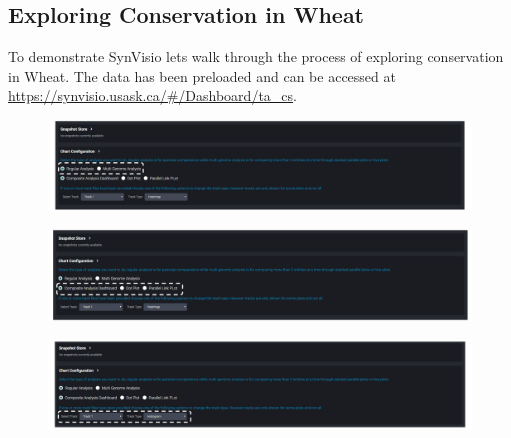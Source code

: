 \documentclass{uofsthesis-cs}
\begin{document}
\begin{appendices}

\chapter{Exploring Conservation in Wheat}

To demonstrate SynVisio lets walk through the process of exploring conservation in Wheat. The data has been preloaded and can be accessed at \url{https://synvisio.usask.ca/#/Dashboard/ta_cs}.

\begin{figure}[h]
      \includegraphics[width=\textwidth]{images/appendix/step_1.PNG}
\end{figure}

\begin{figure}[h]
      \includegraphics[width=\textwidth]{images/appendix/step_2.PNG}
\end{figure}

\begin{figure}[h]
      \includegraphics[width=\textwidth]{images/appendix/step_3.PNG}
\end{figure}


\end{appendices}
\end{document}
